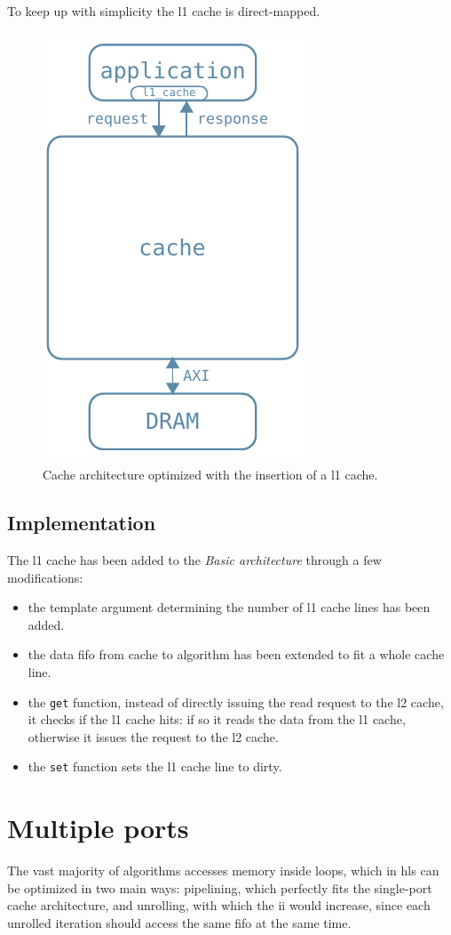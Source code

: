 \documentclass[11pt,a4paper,oneside]{memoir}
\begin{document}
To keep up with simplicity the \ac{l1} cache is direct-mapped.

\begin{figure}
	\centering
	\includegraphics[width=.3\textwidth]{l1_arch}
	\caption{Cache architecture optimized with the insertion of a \ac{l1}
	cache.}
	\label{fig:l1_arch}
\end{figure}

\subsection{Implementation}
The \ac{l1} cache has been added to the \emph{Basic architecture} through a few
modifications:
\begin{itemize}
	\item the template argument determining the number of \ac{l1} cache
		lines has been added.
	\item the data \ac{fifo} from cache to algorithm has been extended to
		fit a whole cache line.
	\item the \texttt{get} function, instead of directly issuing the read
		request to the \ac{l2} cache, it checks if the \ac{l1} cache
		hits: if so it reads the data from the \ac{l1} cache, otherwise
		it issues the request to the \ac{l2} cache.
	\item the \texttt{set} function sets the \ac{l1} cache line to dirty.
\end{itemize}

\section{Multiple ports}
The vast majority of algorithms accesses memory inside loops, which in \ac{hls}
can be optimized in two main ways: pipelining, which perfectly fits the
single-port cache architecture, and unrolling, with which the \ac{ii} would
increase, since each unrolled iteration should access the same \ac{fifo} at the
same time.
\end{document}
